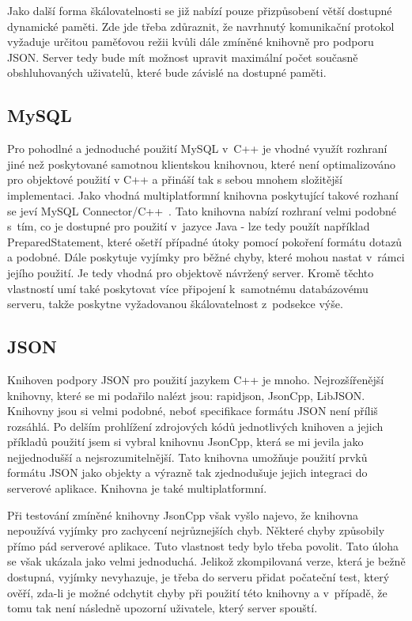 \documentclass[thesis=B,czech]{FITthesis}[2013/10/20]
\begin{document}
Jako další forma škálovatelnosti se již nabízí pouze přizpůsobení větší dostupné dynamické paměti. Zde jde třeba zdůraznit, že navrhnutý komunikační protokol vyžaduje určitou paměťovou režii kvůli dále zmíněné knihovně pro podporu JSON. Server tedy bude mít možnost upravit maximální počet současně obshluhovaných uživatelů, které bude závislé na dostupné paměti.

\subsection{MySQL}

Pro pohodlné a jednoduché použití MySQL v~C++ je vhodné využít rozhraní jiné než poskytované samotnou klientskou knihovnou, které není optimalizováno pro objektové použití v C++ a přináší tak s sebou mnohem složitější implementaci. Jako vhodná multiplatformní knihovna poskytující takové rozhaní se jeví MySQL Connector/C++~\cite{mysqlconn}. Tato knihovna nabízí rozhraní velmi podobné s~tím, co je dostupné pro použití v~jazyce Java - lze tedy použít například PreparedStatement, které ošetří případné útoky pomocí pokoření formátu dotazů a podobné. Dále poskytuje vyjímky pro běžné chyby, které mohou nastat v~rámci jejího použití. Je tedy vhodná pro objektově návržený server. Kromě těchto vlastností umí také poskytovat více připojení k~samotnému databázovému serveru, takže poskytne vyžadovanou škálovatelnost z~podsekce výše.

\subsection{JSON}

Knihoven podpory JSON pro použití jazykem C++ je mnoho. Nejrozšířenější knihovny, které se mi podařilo nalézt jsou: rapidjson, JsonCpp, LibJSON. Knihovny jsou si velmi podobné, neboť specifikace formátu JSON není příliš rozsáhlá. Po delším prohlížení zdrojových kódů jednotlivých knihoven a jejich příkladů použití jsem si vybral knihovnu JsonCpp, která se mi jevila jako nejjednodušší a nejsrozumitelnější. Tato knihovna umožňuje použití prvků formátu JSON jako objekty a výrazně tak zjednodušuje jejich integraci do serverové aplikace. Knihovna je také multiplatformní.

Při testování zmíněné knihovny JsonCpp však vyšlo najevo, že knihovna nepoužívá vyjímky pro zachycení nejrůznejších chyb. Některé chyby způsobily přímo pád serverové aplikace. Tuto vlastnost tedy bylo třeba povolit. Tato úloha se však ukázala jako velmi jednoduchá. Jelikož zkompilovaná verze, která je bežně dostupná, vyjímky nevyhazuje, je třeba do serveru přidat počateční test, který ověří, zda-li je možné odchytit chyby při použití této knihovny a v~případě, že tomu tak není následně upozorní uživatele, který server spouští.
\end{document}
